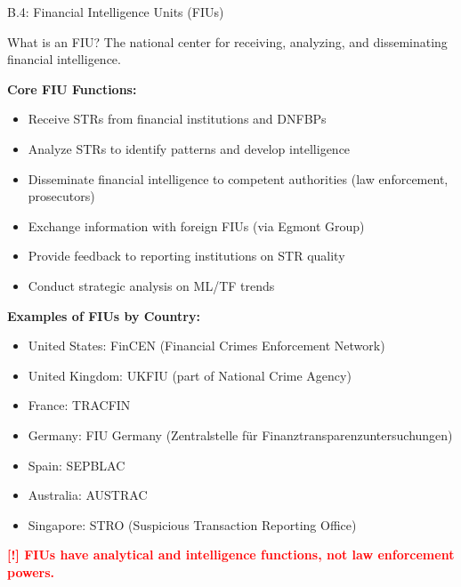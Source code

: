 \documentclass[11pt,a4paper]{beamer}
\newcommand{\redflag}[1]{\textcolor{red}{\textbf{[!] #1}}}
\begin{document}
	\begin{frame}{B.4: Financial Intelligence Units (FIUs)}
		\begin{block}{What is an FIU?}
			The national center for receiving, analyzing, and disseminating financial intelligence.
		\end{block}
		\textbf{Core FIU Functions:}
		\begin{itemize}
			\item Receive STRs from financial institutions and DNFBPs
			\item Analyze STRs to identify patterns and develop intelligence
			\item Disseminate financial intelligence to competent authorities (law enforcement, prosecutors)
			\item Exchange information with foreign FIUs (via Egmont Group)
			\item Provide feedback to reporting institutions on STR quality
			\item Conduct strategic analysis on ML/TF trends
		\end{itemize}
		\textbf{Examples of FIUs by Country:}
		\begin{itemize}
			\item United States: FinCEN (Financial Crimes Enforcement Network)
			\item United Kingdom: UKFIU (part of National Crime Agency)
			\item France: TRACFIN
			\item Germany: FIU Germany (Zentralstelle für Finanztransparenzuntersuchungen)
			\item Spain: SEPBLAC
			\item Australia: AUSTRAC
			\item Singapore: STRO (Suspicious Transaction Reporting Office)
		\end{itemize}
		\redflag{FIUs have analytical and intelligence functions, not law enforcement powers.}
	\end{frame}
	
\end{document}
